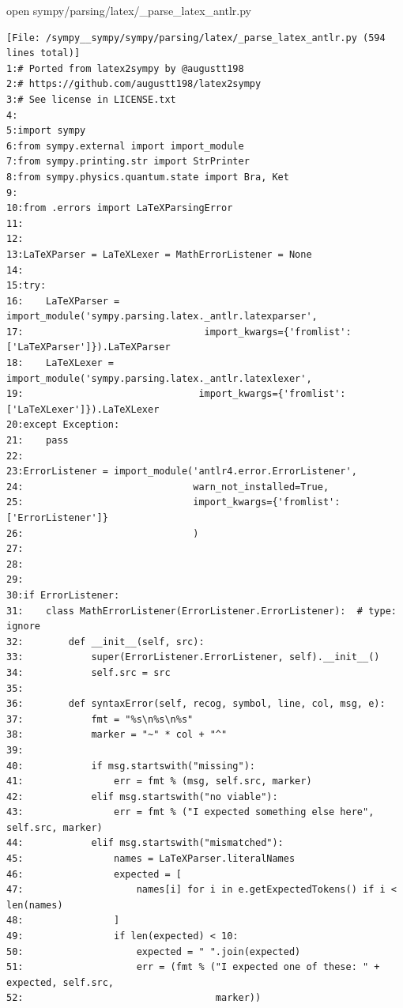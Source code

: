 {\begin{agentbox}
\hrulefill
\begin{CodeVerbatim}[breaklines=true, breakanywhere=true]
open sympy/parsing/latex/_parse_latex_antlr.py
\end{CodeVerbatim}
\end{agentbox}
\begin{observationbox}\begin{Verbatim}[breaklines=true, breakanywhere=true]
[File: /sympy__sympy/sympy/parsing/latex/_parse_latex_antlr.py (594 lines total)]
1:# Ported from latex2sympy by @augustt198
2:# https://github.com/augustt198/latex2sympy
3:# See license in LICENSE.txt
4:
5:import sympy
6:from sympy.external import import_module
7:from sympy.printing.str import StrPrinter
8:from sympy.physics.quantum.state import Bra, Ket
9:
10:from .errors import LaTeXParsingError
11:
12:
13:LaTeXParser = LaTeXLexer = MathErrorListener = None
14:
15:try:
16:    LaTeXParser = import_module('sympy.parsing.latex._antlr.latexparser',
17:                                import_kwargs={'fromlist': ['LaTeXParser']}).LaTeXParser
18:    LaTeXLexer = import_module('sympy.parsing.latex._antlr.latexlexer',
19:                               import_kwargs={'fromlist': ['LaTeXLexer']}).LaTeXLexer
20:except Exception:
21:    pass
22:
23:ErrorListener = import_module('antlr4.error.ErrorListener',
24:                              warn_not_installed=True,
25:                              import_kwargs={'fromlist': ['ErrorListener']}
26:                              )
27:
28:
29:
30:if ErrorListener:
31:    class MathErrorListener(ErrorListener.ErrorListener):  # type: ignore
32:        def __init__(self, src):
33:            super(ErrorListener.ErrorListener, self).__init__()
34:            self.src = src
35:
36:        def syntaxError(self, recog, symbol, line, col, msg, e):
37:            fmt = "%s\n%s\n%s"
38:            marker = "~" * col + "^"
39:
40:            if msg.startswith("missing"):
41:                err = fmt % (msg, self.src, marker)
42:            elif msg.startswith("no viable"):
43:                err = fmt % ("I expected something else here", self.src, marker)
44:            elif msg.startswith("mismatched"):
45:                names = LaTeXParser.literalNames
46:                expected = [
47:                    names[i] for i in e.getExpectedTokens() if i < len(names)
48:                ]
49:                if len(expected) < 10:
50:                    expected = " ".join(expected)
51:                    err = (fmt % ("I expected one of these: " + expected, self.src,
52:                                  marker))

\end{Verbatim}
\end{observationbox}}
